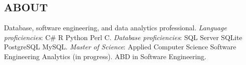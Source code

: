 \documentclass[margin, 10pt]{res} %
\begin{document}
\begin{resume}

 
\section{ABOUT}  

    Database, software engineering, and data analytics professional. 
    \textit{Language proficiencies}:  C\# \textpipe{}   R \textpipe{}    Python \textpipe{}    Perl \textpipe{}    C. 
    \textit{Database proficiencies}: SQL Server \textpipe{}    SQLite \textpipe{}    PostgreSQL \textpipe{}    MySQL. 
    \textit{Master of Science}: Applied Computer Science \textpipe{}    Software Engineering \textpipe{}    Analytics (in progress). 
    ABD in Software Engineering. 





\end{resume}
\end{document}
